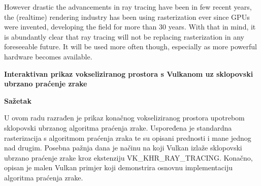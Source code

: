 \documentclass[times, utf8, zavrsni, numeric]{fer}
\begin{document}
However drastic the advancements in ray tracing have been in few recent years, the (realtime) rendering industry has been using rasterization ever since GPUs were invented, developing the field for more than 30 years. With that in mind, it is abundantly clear that ray tracing will not be replacing rasterization in any foreseeable future. It will be used more often though, especially as more powerful hardware becomes available.




\newpage
\vspace*{\fill}
\thispagestyle{empty}
\begin{center}
	{\bf Interaktivan prikaz vokseliziranog prostora s Vulkanom uz sklopovski ubrzano praćenje zrake}
\end{center}
\hspace*{\fill} {\bf Sa\v{z}etak} \hspace*{\fill} \par
\vspace*{25pt}

U ovom radu razrađen je prikaz konačnog vokseliziranog prostora upotrebom sklopovski ubrzanog algoritma praćenja zrake. Uspoređena je standardna rasterizacija s algoritmom praćenja zraka te su opisani prednosti i mane jednog nad drugim. Posebna pažnja dana je načinu na koji Vulkan izlaže sklopovski ubrzano praćenje zrake kroz ekstenziju VK\_KHR\_RAY\_TRACING. Konačno, opisan je malen Vulkan primjer koji demonstrira osnovnu implementaciju algoritma praćenja zrake.


\begin{abstract}
This paper explores the real-time representation of finite voxelized space using hardware-accelerated ray tracing. It compares standard rasterization to ray tracing and outlines the benefits and drawbacks of one over the other. It's explored how Vulkan exposes hardware ray tracing capabilities through its  VK\_KHR\_RAY\_TRACING extension. Finally, a small Vulkan example is described that shows a basic implementation of the ray tracing algorithm.

\end{abstract}
\end{document}
